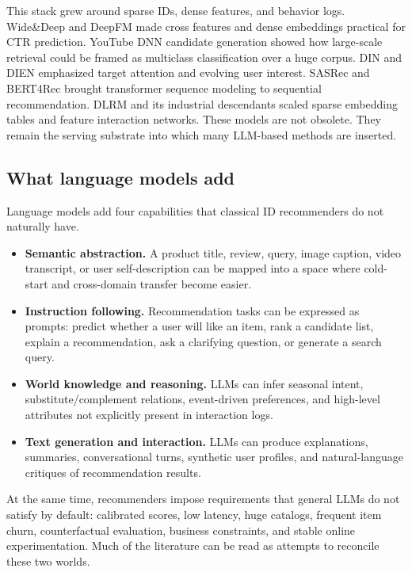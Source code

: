 \documentclass[11pt]{article}
\begin{document}
This stack grew around sparse IDs, dense features, and behavior logs. Wide\&Deep and DeepFM made cross features and dense embeddings practical for CTR prediction. YouTube DNN candidate generation showed how large-scale retrieval could be framed as multiclass classification over a huge corpus. DIN and DIEN emphasized target attention and evolving user interest. SASRec and BERT4Rec brought transformer sequence modeling to sequential recommendation. DLRM and its industrial descendants scaled sparse embedding tables and feature interaction networks. These models are not obsolete. They remain the serving substrate into which many LLM-based methods are inserted.

\subsection{What language models add}

Language models add four capabilities that classical ID recommenders do not naturally have.

\begin{itemize}
  \item \textbf{Semantic abstraction.} A product title, review, query, image caption, video transcript, or user self-description can be mapped into a space where cold-start and cross-domain transfer become easier.
  \item \textbf{Instruction following.} Recommendation tasks can be expressed as prompts: predict whether a user will like an item, rank a candidate list, explain a recommendation, ask a clarifying question, or generate a search query.
  \item \textbf{World knowledge and reasoning.} LLMs can infer seasonal intent, substitute/complement relations, event-driven preferences, and high-level attributes not explicitly present in interaction logs.
  \item \textbf{Text generation and interaction.} LLMs can produce explanations, summaries, conversational turns, synthetic user profiles, and natural-language critiques of recommendation results.
\end{itemize}

At the same time, recommenders impose requirements that general LLMs do not satisfy by default: calibrated scores, low latency, huge catalogs, frequent item churn, counterfactual evaluation, business constraints, and stable online experimentation. Much of the literature can be read as attempts to reconcile these two worlds.
\end{document}
